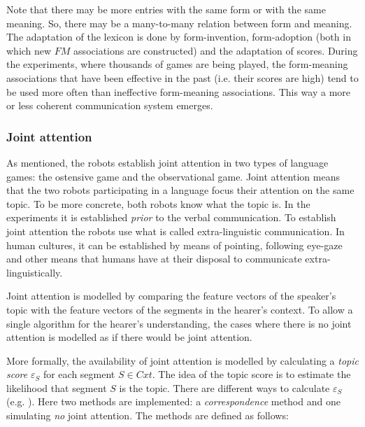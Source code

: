 Note that there may be more entries with the same form or with the same meaning. So, there may be a many-to-many relation between form and meaning. The adaptation of the lexicon is done by form-invention, form-adoption (both in which new $FM$ associations are constructed) and the adaptation of scores. During the experiments, where thousands of games are being played, the form-meaning associations that have been effective in the past (i.e. their scores are high) tend to be used more often than ineffective form-meaning associations. This way a more or less coherent communication system emerges.

\subsubsection{Joint attention}

As mentioned, the robots establish joint attention in two types of language games: the ostensive game and the observational game. Joint attention means that the two robots participating in a language focus their attention on the same topic. To be more concrete, both robots know what the topic is. In the experiments it is established {\em prior} to the verbal communication. To establish joint attention the robots use what is called extra-linguistic communication. In human cultures, it can be established by means of pointing, following eye-gaze and other means that humans have at their disposal to communicate extra-linguistically.

Joint attention is modelled by comparing the feature vectors of the speaker's topic with the feature vectors of the segments in the hearer's context. To allow a single algorithm for the hearer's understanding, the cases where there is no joint attention is modelled as if there would be joint attention. 

More formally, the availability of joint attention is modelled by calculating a {\em topic score} $\varepsilon_S$ for each segment $S \in Cxt$. The idea of the topic score is to estimate the likelihood that segment $S$ is the topic. There are different ways to calculate $\varepsilon_S$ (e.g. \citealt{vogt:1998c}). Here two methods are implemented: a {\em correspondence} method and one simulating {\em no} joint attention. The methods are defined as follows:

